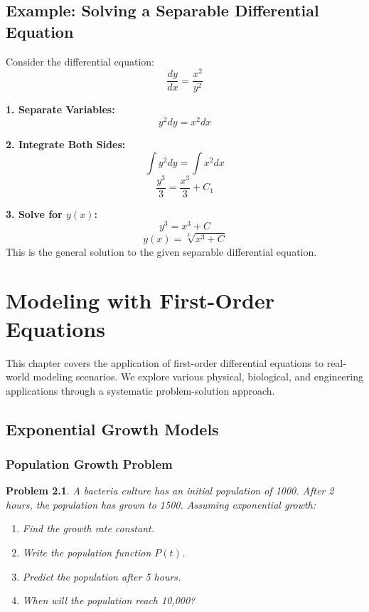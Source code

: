 \documentclass[12pt, letterpaper]{book}
\newcounter{problemcounter}[chapter]
\theoremstyle{problemstyle}
\newtheorem{problem}[problemcounter]{Problem}
\theoremstyle{solutionstyle}
\begin{document}
\section{Example: Solving a Separable Differential Equation}
Consider the differential equation:
\begin{equation*}
    \frac{dy}{dx} = \frac{x^2}{y^2}
\end{equation*}

\textbf{1. Separate Variables:}
\begin{equation*}
    y^2 dy = x^2 dx
\end{equation*}

\textbf{2. Integrate Both Sides:}
\begin{equation*}
    \int y^2 dy = \int x^2 dx
\end{equation*}
\begin{equation*}
    \frac{y^3}{3} = \frac{x^3}{3} + C_1
\end{equation*}

\textbf{3. Solve for $y(x)$:}
\begin{equation*}
    y^3 = x^3 + C
\end{equation*}
\begin{equation*}
    y(x) = \sqrt[3]{x^3 + C}
\end{equation*}
This is the general solution to the given separable differential equation.

\chapter{Modeling with First-Order Equations}
\label{chap:session_3}

This chapter covers the application of first-order differential equations to real-world modeling scenarios. We explore various physical, biological, and engineering applications through a systematic problem-solution approach.

\section{Exponential Growth Models}

\subsection{Population Growth Problem}

\begin{problem}
A bacteria culture has an initial population of 1000. After 2 hours, the population has grown to 1500. Assuming exponential growth:
\begin{enumerate}
    \item Find the growth rate constant.
    \item Write the population function $P(t)$.
    \item Predict the population after 5 hours.
    \item When will the population reach 10,000?
\end{enumerate}
\end{problem}
\end{document}
